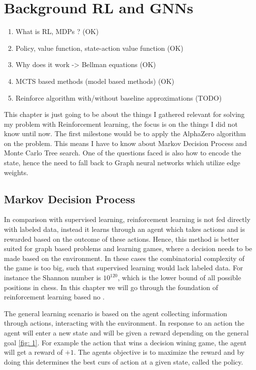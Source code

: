 \chapter{Background RL and GNNs}
\begin{enumerate}
    \item What is RL, MDPs ? (OK)
    \item Policy, value function, state-action value function (OK)
    \item Why does it work -> Bellman equations (OK)
    \item MCTS based methods (model based methods) (OK)
    \item Reinforce algorithm with/without baseline approximations (TODO)
\end{enumerate}
This chapter is just going to be about the things I gathered relevant for
solving my problem with Reinforcement learning, the focus is on the things I
did not know until now. The first milestone would be to apply the AlphaZero
algorithm on the problem. This means I have to know about Markov Decision
Process and Monte Carlo Tree search. One of the questions faced is also how
to encode the state, hence the need to fall back to Graph neural networks
which utilize edge weights.
\section{Markov Decision Process}
In comparison with supervised learning, reinforcement learning is not fed
directly with labeled data, instead it learns through an agent which takes
actions and is rewarded based on the outcome of these actions. Hence, this
method is better suited for graph based problems and learning games, where a
decision needs to be made based on the environment. In these cases the
combinatorial complexity of the game is too big, such that supervised
learning would lack labeled data. For instance the Shannon number is
$10^{120}$, which is the lower bound of all possible positions in chess.
In this chapter we will go through the foundation of reinforcement learning
based no \cite[Chapter~17]{ml_foundations}.

The general learning scenario is based on the agent collecting information
through actions, interacting with the environment. In response to an action
the agent will enter a new state and will be given a reward depending on the
general goal \ref{fig: 1}. For example the action that wins a decision wining game, the
agent will get a reward of $+1$. The agents objective is to maximize the
reward and by doing this determines the best curs of action at a given
state, called the policy.


